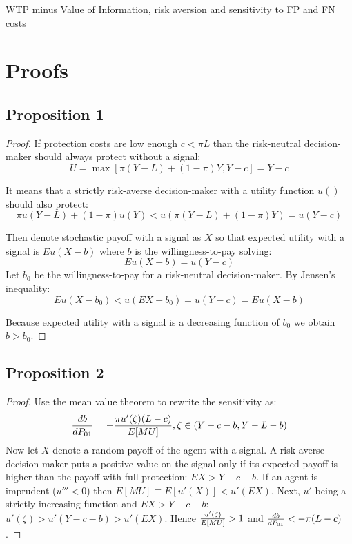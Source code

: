 \documentclass[12pt,a4paper]{article}
\begin{document}
 \label{wtp_dem}


\begin{table}[h!]
\caption{WTP minus Value of Information, risk aversion and sensitivity to FP and FN costs} \label{tab:wtp_risk}

\end{table}

%
%
%





\newpage
\section{Proofs}
\small

\subsection{Proposition 1}
\begin{proof} If protection costs are low enough $c<\pi L$ than the risk-neutral decision-maker should always protect without a signal:
$$U=\max[\pi(Y-L)+(1-\pi)Y,Y-c]=Y-c$$

It means that a strictly risk-averse decision-maker with a utility function $u()$ should also protect:
$$\pi u(Y-L)+(1-\pi)u(Y)<u(\pi(Y-L)+(1-\pi)Y)=u(Y-c)$$

Then denote stochastic payoff with a signal as $X$ so that expected utility with a signal is $Eu(X-b)$ where $b$ is the willingness-to-pay solving:
$$Eu(X-b)=u(Y-c)$$
 Let $b_0$ be the willingness-to-pay for a risk-neutral decision-maker. By Jensen's inequality:
$$Eu(X-b_0)<u(EX-b_0)=u(Y-c)=Eu(X-b)$$

Because expected utility with a signal is a decreasing function of $b_0$ we obtain $b>b_0$. \end{proof} 

\subsection{Proposition 2}
\begin{proof}
Use the mean value theorem to rewrite the sensitivity as:
$${db\over dP_{01}}=-{\pi u'(\zeta)(L-c)\over E[MU]},\zeta \in \left(Y-c-b, Y-L-b\right)$$
Now let $X$ denote a random payoff of the agent with a signal. A risk-averse decision-maker puts a positive value on the signal only if its expected payoff is higher than the payoff with full protection: $EX>Y-c-b$. If an agent is imprudent ($u'''<0$) then $E[MU]\equiv E[u'(X)]<u'(EX)$. Next, $u'$ being a strictly increasing function and $EX>Y-c-b$: $u'(\zeta)>u'(Y-c-b)>u'(EX)$. Hence ${u'(\zeta)\over E[MU]}>1$ and ${db\over dP_{01}}<-\pi(L-c)$. 
\end{proof}
\end{document}
